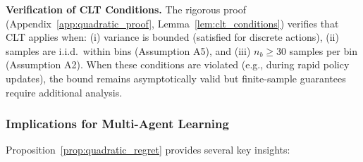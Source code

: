 \textbf{Verification of CLT Conditions.} The rigorous proof (Appendix~\ref{app:quadratic_proof}, Lemma~\ref{lem:clt_conditions}) verifies that CLT applies when: (i) variance is bounded (satisfied for discrete actions), (ii) samples are i.i.d.\ within bins (Assumption A5), and (iii) $n_b \geq 30$ samples per bin (Assumption A2). When these conditions are violated (e.g., during rapid policy updates), the bound remains asymptotically valid but finite-sample guarantees require additional analysis.

\subsubsection{Implications for Multi-Agent Learning}

Proposition~\ref{prop:quadratic_regret} provides several key insights:

